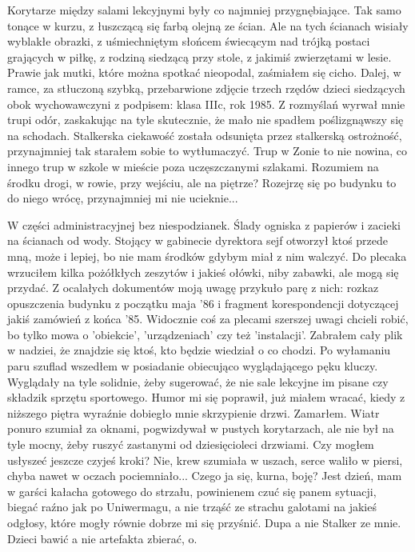 \documentclass[../MAIN.tex]{subfiles}
\begin{document}
Korytarze między salami lekcyjnymi były co najmniej przygnębiające. Tak samo tonące w kurzu, z łuszczącą się farbą olejną ze ścian. Ale na tych ścianach wisiały wyblakłe obrazki, z uśmiechniętym słońcem świecącym nad trójką postaci grających w piłkę, z rodziną siedzącą przy stole, z jakimiś zwierzętami w lesie. Prawie jak mutki, które można spotkać nieopodal, zaśmiałem się cicho. Dalej, w ramce, za stłuczoną szybką, przebarwione zdjęcie trzech rzędów dzieci siedzących obok wychowawczyni z podpisem: klasa IIIc, rok 1985. Z rozmyślań wyrwał mnie trupi odór, zaskakując na tyle skutecznie, że mało nie spadłem poślizgnąwszy się na schodach. Stalkerska ciekawość została odsunięta przez stalkerską ostrożność, przynajmniej tak starałem sobie to wytłumaczyć. Trup w Zonie to nie nowina, co innego trup w szkole w mieście poza uczęszczanymi szlakami. Rozumiem na środku drogi, w rowie, przy wejściu, ale na piętrze? Rozejrzę się po budynku to do niego wrócę, przynajmniej mi nie ucieknie...

W części administracyjnej bez niespodzianek. Ślady ogniska z papierów i zacieki na ścianach od wody. Stojący w gabinecie dyrektora sejf otworzył ktoś przede mną, może i lepiej, bo nie mam środków gdybym miał z nim walczyć. Do plecaka wrzuciłem kilka pożółkłych zeszytów i jakieś ołówki, niby zabawki, ale mogą się przydać. Z ocalałych dokumentów moją uwagę przykuło parę z nich: rozkaz opuszczenia budynku z początku maja '86 i fragment korespondencji dotyczącej jakiś zamówień z końca '85. Widocznie coś za plecami szerszej uwagi chcieli robić, bo tylko mowa o 'obiekcie', 'urządzeniach' czy też 'instalacji'. Zabrałem cały plik w nadziei, że znajdzie się ktoś, kto będzie wiedział o co chodzi. Po wyłamaniu paru szuflad wszedłem w posiadanie obiecująco wyglądającego pęku kluczy. Wyglądały na tyle solidnie, żeby sugerować, że nie sale lekcyjne im pisane czy składzik sprzętu sportowego. Humor mi się poprawił, już miałem wracać, kiedy z niższego piętra wyraźnie dobiegło mnie skrzypienie drzwi. Zamarłem. Wiatr ponuro szumiał za oknami, pogwizdywał w pustych korytarzach, ale nie był na tyle mocny, żeby ruszyć zastanymi od dziesięcioleci drzwiami. Czy mogłem usłyszeć jeszcze czyjeś kroki? Nie, krew szumiała w uszach, serce waliło w piersi, chyba nawet w oczach pociemniało... Czego ja się, kurna, boję? Jest dzień, mam w garści kałacha gotowego do strzału, powinienem czuć się panem sytuacji, biegać raźno jak po Uniwermagu, a nie trząść ze strachu galotami na jakieś odgłosy, które mogły równie dobrze mi się przyśnić. Dupa a nie Stalker ze mnie. Dzieci bawić a nie artefakta zbierać, o.
\end{document}
